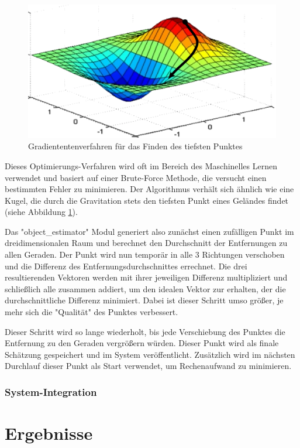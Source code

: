 \documentclass[12pt, ngerman]{article}
\begin{document}
\begin{figure}
  \includegraphics[width=\linewidth]{gradient_descent.png}
  \caption{Gradiententenverfahren für das Finden des tiefsten Punktes}
  \label{Abb: gradient_descent}
\end{figure}
Dieses Optimierungs-Verfahren wird oft im Bereich des Maschinelles Lernen verwendet und basiert auf einer Brute-Force Methode, die versucht einen bestimmten Fehler zu minimieren. Der Algorithmus verhält sich ähnlich wie eine Kugel, die durch die Gravitation stets den tiefsten Punkt eines Geländes findet (siehe Abbildung \ref{Abb: gradient_descent}).

Das "object\_estimator" Modul generiert also zunächst einen zufälligen Punkt im dreidimensionalen Raum und berechnet den Durchschnitt der Entfernungen zu allen Geraden. Der Punkt wird nun temporär in alle 3 Richtungen verschoben und die Differenz des Entfernungsdurchschnittes errechnet. Die drei resultierenden Vektoren werden mit ihrer jeweiligen Differenz multipliziert und schließlich alle zusammen addiert, um den idealen Vektor zur erhalten, der die durchschnittliche Differenz minimiert. Dabei ist dieser Schritt umso größer, je mehr sich die "Qualität" des Punktes verbessert. 

Dieser Schritt wird so lange wiederholt, bis jede Verschiebung des Punktes die Entfernung zu den Geraden vergrößern würden. Dieser Punkt wird als finale Schätzung gespeichert und im System veröffentlicht. Zusätzlich wird im nächsten Durchlauf dieser Punkt als Start verwendet, um Rechenaufwand zu minimieren.

\subsubsection{System-Integration}


\section{Ergebnisse}

\newpage
\nocite{*}
{}
 
\end{document}
